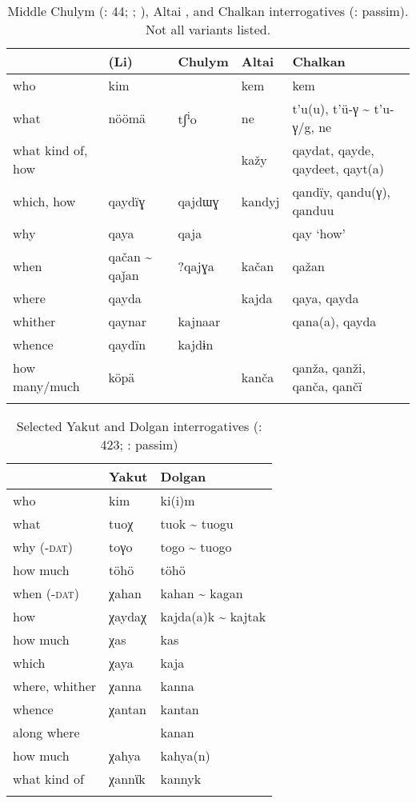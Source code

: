   \begin{table}
\caption{Middle Chulym (\citealt{LiYong-Sŏng2008}: 44; \citealt{AndersonHarrison2006}; \citealt{Harrison2003}), Altai \citep[183]{Baskakov1997}, and Chalkan interrogatives (\citealt{Erdal2013}: passim). Not all variants listed.}
\label{tab:turk:16}

\begin{tabularx}{\textwidth}{llllQ}
\lsptoprule
& \textbf{ (Li)} & \textbf{Chulym} & \textbf{Altai} & \textbf{Chalkan}\\
\midrule
who & kim &  & kem & kem\\
what & nöömä & tʃ\textsuperscript{i}o & ne & t’u(u), t’ü-γ {\textasciitilde} t’u-γ/g, ne\\
what kind of, how &  &  & kažy & qaydat, qayde, qaydeet, qayt(a)\\
which, how & qaydïɣ & qajdɯɣ & kandyj & qandïy, qandu(γ), qanduu\\
why & qaya & qaja &  & qay ‘how’\\
when & qačan {\textasciitilde} qaǰan & ?qajɣa & kačan & qažan\\
where & qayda &  & kajda & qaya, qayda\\
whither & qaynar & kajnaar &  & qana(a), qayda\\
whence & qaydïn & kajdɨn &  & \\
how many/much & köpä &  & kanča & qanža, qanži, qanča, qančï\\
\lspbottomrule
\end{tabularx}
\end{table}



\clearpage %
\begin{table}[t]
\caption{Selected Yakut and Dolgan interrogatives (\citealt{Stachowski1998}: 423; \citealt{Stachowski1993}: passim)}
\label{tab:turk:17}

\begin{tabularx}{\textwidth}{XXl}
\lsptoprule
& \textbf{Yakut} & \textbf{Dolgan}\\
\midrule
who & kim & ki(i)m\\
what & tuoχ & tuok {\textasciitilde} tuogu\\
why (-\textsc{dat}) & toγo & togo {\textasciitilde} tuogo\\
how much & töhö & töhö\\
when (-\textsc{dat}) & χahan & kahan {\textasciitilde} kagan\\
how & χaydaχ & kajda(a)k {\textasciitilde} kajtak\\
how much & χas & kas\\
which & χaya & kaja\\
where, whither & χanna & kanna\\
whence & χantan & kantan\\
along where &  & kanan\\
how much & χahya & kahya(n)\\
what kind of & χannϊk & kannyk\\
\lspbottomrule
\end{tabularx}
\end{table}

  